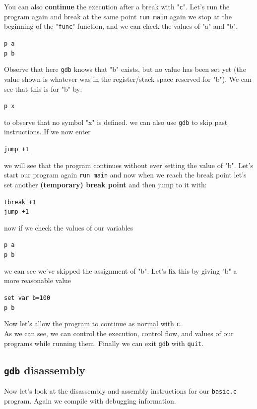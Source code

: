 \documentclass{article}
\begin{document}
\noindent You can also \textbf{continue} the execution after a break with "\lstinline{c}".
Let's run the program again and break at the same point \lstinline{run main} again we stop at the beginning of the "\lstinline{func}" function, and we can check the values of "a" and "b".
\begin{center}
    \lstinline{p a}\\
    \lstinline{p b}
\end{center}
\noindent Observe that here \lstinline{gdb} knows that "b" exists, but no value has been set yet
(the value shown is whatever was in the register/stack space reserved for
"b"). We can see that this is for "b" by:
\begin{center}
    \lstinline{p x}
\end{center}
\noindent to observe that no symbol "x" is defined.
we can also use \lstinline{gdb} to skip past instructions. If we now enter
\begin{center}
    \lstinline{jump +1}
\end{center}
\noindent we will see that the program continues without ever setting the value of "b". Let's start our program again \lstinline{run main} and now when we reach the break point let's set another \textbf{(temporary) break point} and then jump to it with:
\begin{center}
    \lstinline{tbreak +1}\\
    \lstinline{jump +1}
\end{center}

\noindent now if we check the values of our variables
\begin{center}
    \lstinline{p a}\\
    \lstinline{p b}
\end{center}
\noindent we can see we've skipped the assignment of "b". Let's fix this by giving "b"
a more reasonable value
\begin{center}
    \lstinline{set var b=100}\\
    \lstinline{p b}
\end{center}
\noindent Now let's allow the program to continue as normal with \lstinline{c}.\\

\noindent As we can see, we can control the execution, control 
flow, and values of our
programs while running them. Finally we can exit \lstinline{gdb} with \lstinline{quit}.


\subsection{\lstinline{gdb} disassembly}
\noindent Now let's look at the disassembly and assembly instructions for our \lstinline{basic.c}
program. Again we compile with debugging information.\\
\end{document}
